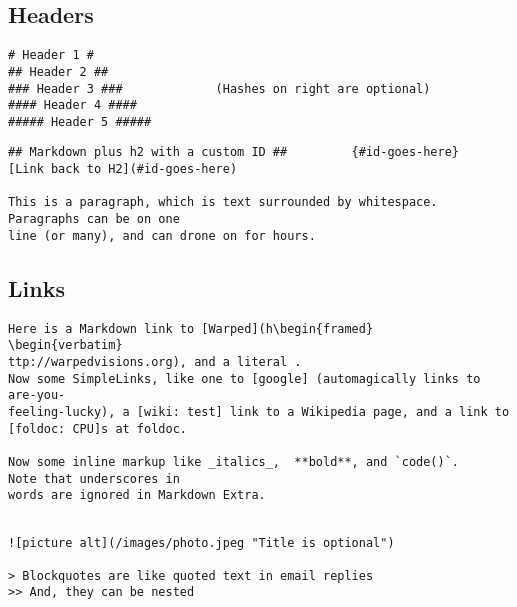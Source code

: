 \documentclass[]{article}
\title{}
\author{}
\begin{document}
	\subsection*{Headers}
\begin{framed}
\begin{verbatim}
# Header 1 #
## Header 2 ##
### Header 3 ###             (Hashes on right are optional)
#### Header 4 ####
##### Header 5 #####
\end{verbatim}
\end{framed}

\begin{framed}
\begin{verbatim}
## Markdown plus h2 with a custom ID ##         {#id-goes-here}
[Link back to H2](#id-goes-here)

This is a paragraph, which is text surrounded by whitespace. 
Paragraphs can be on one 
line (or many), and can drone on for hours.  
\end{verbatim}
\end{framed}

\subsection*{Links}
\begin{framed}
	\begin{verbatim}
Here is a Markdown link to [Warped](h\begin{framed}
\begin{verbatim}
ttp://warpedvisions.org), and a literal . 
Now some SimpleLinks, like one to [google] (automagically links to are-you-
feeling-lucky), a [wiki: test] link to a Wikipedia page, and a link to 
[foldoc: CPU]s at foldoc.  

Now some inline markup like _italics_,  **bold**, and `code()`. 
Note that underscores in 
words are ignored in Markdown Extra.
\end{verbatim}
\end{framed}
\newpage
\begin{framed}
	\begin{verbatim}
	
![picture alt](/images/photo.jpeg "Title is optional")     

> Blockquotes are like quoted text in email replies
>> And, they can be nested

\end{verbatim}
\end{framed}
\end{document}
